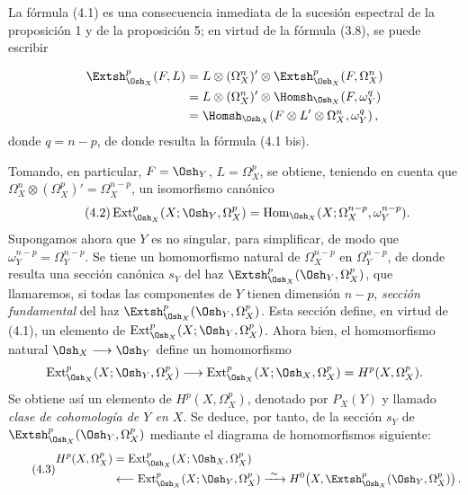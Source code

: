 La fórmula (4.1) es una consecuencia inmediata de la sucesión espectral de la
proposición 1 y de la proposición 5; en virtud de la fórmula (3.8), se puede
escribir

\begin{align*}
\Extsh_{\Osh_X}^{p}(F,L)
&=L\otimes(\Omega_X^{n})'\otimes
  \Extsh_{\Osh_X}^{p}(F,\Omega_X^{n})\\
&=L\otimes(\Omega_X^{n})'\otimes
  \Homsh_{\Osh_X}(F,\omega_Y^{q})\\
&=\Homsh_{\Osh_X}\!\left(
  F\otimes L'\otimes\Omega_X^{n},\omega_Y^{q}\right),
\end{align*}
donde $q=n-p$, de donde resulta la fórmula (4.1 bis).

Tomando, en particular, $F=\Osh_Y$, $L=\Omega_X^{p}$, se obtiene, teniendo en cuenta
que $\Omega_X^{n}\otimes(\Omega_X^{p})'=\Omega_X^{n-p}$, un isomorfismo
canónico
\begin{equation}\tag{4.2}
  \operatorname{Ext}_{\Osh_X}^{p}(X;\Osh_Y,\Omega_X^{p})
  =\operatorname{Hom}_{\Osh_X}
  (X;\Omega_X^{n-p},\omega_Y^{n-p}).
\end{equation}
Supongamos ahora que $Y$ es no singular, para simplificar, de modo que
$\omega_Y^{n-p}=\Omega_Y^{n-p}$. Se tiene un homomorfismo natural de
$\Omega_X^{n-p}$ en $\Omega_Y^{n-p}$, de donde resulta una sección canónica $s_Y$ del
haz $\Extsh_{\Osh_X}^{p}(\Osh_Y,\Omega_X^{p})$, que llamaremos, si
todas las componentes de $Y$ tienen dimensión $n-p$, \emph{sección
fundamental} del haz $\Extsh_{\Osh_X}^{p}(\Osh_Y,\Omega_X^{p})$. Esta
sección define, en virtud de (4.1), un elemento de
$\operatorname{Ext}_{\Osh_X}^{p}(X;\Osh_Y,\Omega_X^{p})$. Ahora bien, el homomorfismo
natural $\Osh_X\longrightarrow\Osh_Y$ define un homomorfismo
\[
  \operatorname{Ext}_{\Osh_X}^{p}(X;\Osh_Y,\Omega_X^{p})
  \longrightarrow
  \operatorname{Ext}_{\Osh_X}^{p}(X;\Osh_X,\Omega_X^{p})
  =H^{p}(X,\Omega_X^{p}).
\]
Se obtiene así un elemento de $H^{p}(X,\Omega_X^{p})$, denotado por $P_X(Y)$ y llamado
\emph{clase de cohomología de $Y$ en $X$}. Se deduce, por tanto, de la sección
$s_Y$ de $\Extsh_{\Osh_X}^{p}(\Osh_Y,\Omega_X^{p})$ mediante el diagrama
de homomorfismos siguiente:
\begin{equation}\tag{4.3}
\begin{aligned}
H^{p}(X,\Omega_X^{p})
&=\operatorname{Ext}_{\Osh_X}^{p}(X;\Osh_X,\Omega_X^{p})\\
&\longleftarrow\operatorname{Ext}_{\Osh_X}^{p}(X;\Osh_Y,\Omega_X^{p})
\xrightarrow{\ \sim\ }
H^{0}\!\left(X,\Extsh_{\Osh_X}^{p}(\Osh_Y,\Omega_X^{p})\right).
\end{aligned}
\end{equation}

